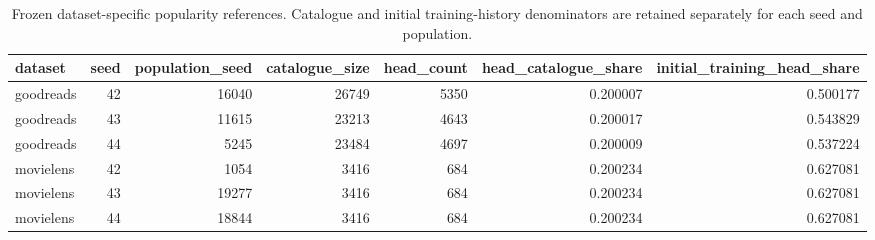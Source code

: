 \begin{table}[htbp!]
\centering
\small
\setlength{\tabcolsep}{3pt}
\renewcommand{\arraystretch}{1.1}
\begin{tabular}{lrrrrrr}
\hline
dataset & seed & population\_seed & catalogue\_size & head\_count & head\_catalogue\_share & initial\_training\_head\_share \\
\hline
goodreads & 42 & 16040 & 26749 & 5350 & 0.200007 & 0.500177 \\
goodreads & 43 & 11615 & 23213 & 4643 & 0.200017 & 0.543829 \\
goodreads & 44 & 5245 & 23484 & 4697 & 0.200009 & 0.537224 \\
movielens & 42 & 1054 & 3416 & 684 & 0.200234 & 0.627081 \\
movielens & 43 & 19277 & 3416 & 684 & 0.200234 & 0.627081 \\
movielens & 44 & 18844 & 3416 & 684 & 0.200234 & 0.627081 \\
\hline
\end{tabular}
\caption{Frozen dataset-specific popularity references. Catalogue and initial training-history denominators are retained separately for each seed and population.}
\label{chap:results:tab:rq6_popularity_references}
\end{table}
